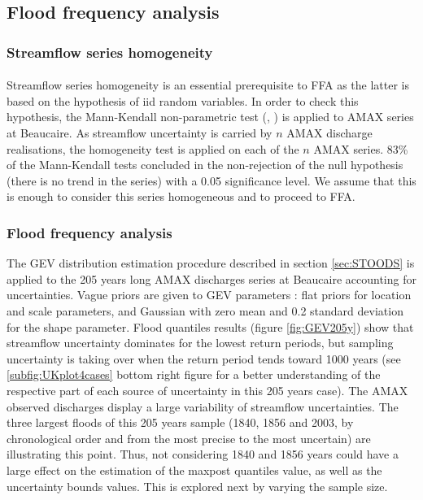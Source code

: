 \documentclass[11pt]{article}
\begin{document}
   
    \subsection{Flood frequency analysis}
    
        \subsubsection{Streamflow series homogeneity}
           
        \paragraph{}
        Streamflow series homogeneity is an essential prerequisite to FFA as the latter is based on the hypothesis of iid random variables. In order to check this hypothesis, the Mann-Kendall non-parametric test (\citet{mann_nonparametric_1945}, \citet{kendall_rank_1948}) is applied to AMAX series at Beaucaire. As streamflow uncertainty is carried by $n$ AMAX discharge realisations, the homogeneity test is applied on each of the $n$ AMAX series. 83\% of the Mann-Kendall tests concluded in the non-rejection of the null hypothesis (there is no trend in the series) with a 0.05 significance level. We assume that this is enough to consider this series homogeneous and to proceed to FFA. 
        
        \subsubsection{Flood frequency analysis}
        
       The GEV distribution estimation procedure described in section \ref{sec:STOODS} is applied to the 205 years long AMAX discharges series at Beaucaire accounting for uncertainties. Vague priors are given to GEV parameters : flat priors for location and scale parameters, and Gaussian with zero mean and 0.2 standard deviation for the shape parameter.
       Flood quantiles results (figure \ref{fig:GEV205y}) show that streamflow uncertainty dominates for the lowest return periods, but sampling uncertainty is taking over when the return period tends toward 1000 years (see \ref{subfig:UKplot4cases} bottom right figure for a better understanding of the respective part of each source of uncertainty in this 205 years case). The AMAX observed discharges display a large variability of streamflow uncertainties. The three largest floods of this 205 years sample (1840, 1856 and 2003, by chronological order and from the most precise to the most uncertain) are illustrating this point. Thus, not considering 1840 and 1856 years could have a large effect on the estimation of the maxpost quantiles value, as well as the uncertainty bounds values. This is explored next by varying the sample size.
       
\end{document}
